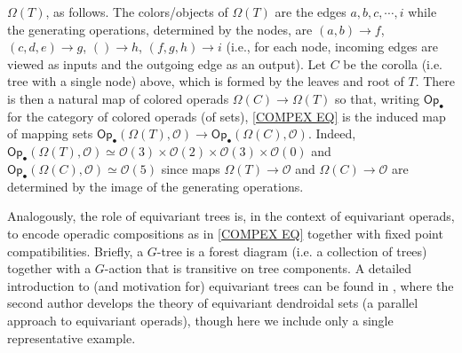 \documentclass[a4paper,10pt
,draft
]{article}%
\numberwithin{equation}{section}
\numberwithin{figure}{section}
\theoremstyle{definition} %
\renewcommand{\O}{\ensuremath{\mathcal O}}
\newcommand{\1}{\ensuremath{\mathbbm 1}}%
\begin{document}
$\Omega(T)$,
as follows.
The colors/objects of $\Omega(T)$
are the edges $a,b,c,\cdots,i$
while the generating operations,
determined by the nodes,
are
$(a,b) \to f$, $(c,d,e) \to g$, $() \to h$, $(f,g,h) \to i$
(i.e., for each node, incoming edges are viewed as inputs 
and the outgoing edge as an output).
Let $C$ be the corolla (i.e. tree with a single node) above,
which is formed by the leaves and root of $T$. 
There is then a natural map of colored operads
$\Omega(C) \to \Omega(T)$
so that,
writing $\mathsf{Op}_{\bullet}$ for the category of colored operads (of sets),
\eqref{COMPEX EQ}
is the induced map of mapping sets
$\mathsf{Op}_{\bullet}
\left(\Omega(T),\O\right)
\to 
\mathsf{Op}_{\bullet}
\left(\Omega(C),\O\right)$.
Indeed,
$\mathsf{Op}_{\bullet}
\left(\Omega(T),\O\right)
\simeq
\O(3) \times \O(2) \times \O(3) \times \O(0)$
and
$\mathsf{Op}_{\bullet}\left(\Omega(C),\O\right) 
\simeq
\O(5)$
since maps 
$\Omega(T) \to \O$
and 
$\Omega(C) \to \O$
are determined by the image of the generating operations.


Analogously, the role of equivariant trees is,
in the context of equivariant operads,
to encode operadic compositions as in \eqref{COMPEX EQ}
together with fixed point compatibilities.
%
Briefly, 
a $G$-tree \cite[Def. 5.44]{Pe16b}
is a forest diagram 
(i.e. a collection of trees)
together with a $G$-action
that is transitive on tree components.
%
A detailed introduction to (and motivation for) 
equivariant trees can be found in \cite[\S 4]{Pe17}, where the second author develops the theory of equivariant dendroidal sets 
(a parallel approach to equivariant operads), 
though here we include only a single representative example.
\end{document}
